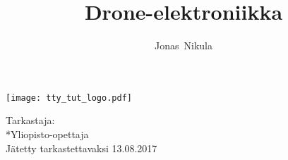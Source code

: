 \documentclass[12pt,a4paper,finnish]{tutthesis}
\author{Jonas~Nikula}
\title{Drone-elektroniikka} %
\begin{document}
\makeatletter



%
\thispagestyle{empty}
\vspace*{-.5cm}\noindent
\texttt{[image: tty\_tut\_logo.pdf]}   %



\vspace{6.8cm}
\maketitle
\vspace{7.7cm} %

\begin{flushright}  
  \begin{minipage}[c]{6.8cm}
    \begin{spacing}{1.0}
      \textsf{Tarkastaja:\\*Yliopisto-opettaja \@examiner}\\
      \textsf{Jätetty tarkastettavaksi 13.08.2017}\\ 
    \end{spacing}
  \end{minipage}
\end{flushright}

\if@twoside
\clearpage
\fi



%
\setcounter{page}{0} %
\end{document}
